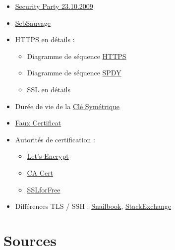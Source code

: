 \begin{itemize}
\tightlist
\item
  \href{https://wiki.alphanet.ch/Ateliers/PresentationSecurityParty}{Security
  Party 23.10.2009}
\item
  \href{http://www.sebsauvage.net/comprendre/ssl/}{SebSauvage}
\item
  HTTPS en détails :

  \begin{itemize}
  \tightlist
  \item
    Diagramme de séquence
    \href{http://www.eventhelix.com/realtimemantra/networking/SSL.pdf}{HTTPS}
  \item
    Diagramme de séquence
    \href{http://www.eventhelix.com/RealtimeMantra/Networking/ssl-tls/https-ssl-tls-session-for-spdy.pdf}{SPDY}
  \item
    \href{https://security.stackexchange.com/questions/20803/how-does-ssl-tls-work/20847\#20847}{SSL}
    en détails
  \end{itemize}
\item
  Durée de vie de la
  \href{https://security.stackexchange.com/questions/55454/how-long-does-an-https-symmetric-key-last}{Clé
  Symétrique}
\item
  \href{http://www.win.tue.nl/hashclash/rogue-ca/}{Faux Certificat}
\item
  Autorités de certification :

  \begin{itemize}
  \tightlist
  \item
    \href{https://letsencrypt.org/}{Let's Encrypt}
  \item
    \href{http://www.cacert.org/}{CA Cert}
  \item
    \href{https://www.sslforfree.com/}{SSLforFree}
  \end{itemize}
\item
  Différences TLS / SSH :
  \href{http://www.snailbook.com/faq/ssl.auto.html}{Snailbook},
  \href{http://security.stackexchange.com/questions/1599/what-is-the-difference-between-ssl-vs-ssh-which-is-more-secure}{StackExchange}
\end{itemize}

\hypertarget{sources}{%
\section{Sources}\label{sources}}
